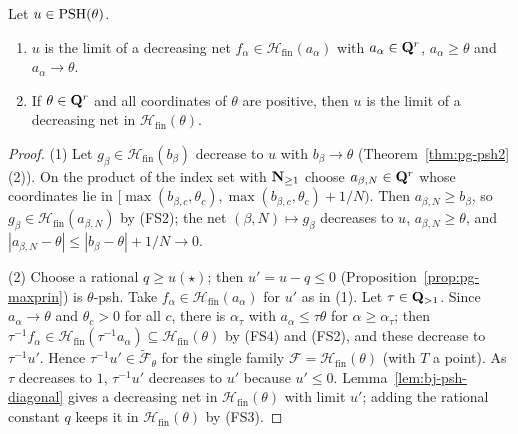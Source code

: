\begin{theorem}\label{thm:pg-regularization}
\leanok
{}
Let $u\in\operatorname{PSH}(\theta)$.
\begin{enumerate}
\item $u$ is the limit of a decreasing net $f_\alpha\in\mathcal H_{\mathrm{fin}}(a_\alpha)$ with $a_\alpha\in\mathbf{Q}^r$,
$a_\alpha\ge\theta$ and $a_\alpha\to\theta$.
\item If $\theta\in\mathbf{Q}^r$ and all coordinates of $\theta$ are positive, then $u$ is the limit of a decreasing net in
$\mathcal H_{\mathrm{fin}}(\theta)$.
\end{enumerate}
\end{theorem}

\begin{proof}
(1) Let $g_\beta\in\mathcal H_{\mathrm{fin}}(b_\beta)$ decrease to $u$ with $b_\beta\to\theta$ (Theorem~\ref{thm:pg-psh2}(2)). On the
product of the index set with $\mathbf{N}_{\ge1}$ choose $a_{\beta,N}\in\mathbf{Q}^r$ whose coordinates lie in
$[\max(b_{\beta,c},\theta_c),\max(b_{\beta,c},\theta_c)+1/N)$. Then $a_{\beta,N}\ge b_\beta$, so $g_\beta\in\mathcal H_{\mathrm{fin}}(a_{\beta,N})$ by
(FS2); the net $(\beta,N)\mapsto g_\beta$ decreases to $u$, $a_{\beta,N}\ge\theta$, and $|a_{\beta,N}-\theta|\le|b_\beta-\theta|+1/N\to0$.

(2) Choose a rational $q\ge u(\star)$; then $u'=u-q\le0$ (Proposition~\ref{prop:pg-maxprin}) is $\theta$-psh. Take
$f_\alpha\in\mathcal H_{\mathrm{fin}}(a_\alpha)$ for $u'$ as in (1). Let $\tau\in\mathbf{Q}_{>1}$. Since $a_\alpha\to\theta$ and $\theta_c>0$ for all
$c$, there is $\alpha_\tau$ with $a_\alpha\le\tau\theta$ for $\alpha\ge\alpha_\tau$; then
$\tau^{-1}f_\alpha\in\mathcal H_{\mathrm{fin}}(\tau^{-1}a_\alpha)\subseteq\mathcal H_{\mathrm{fin}}(\theta)$ by (FS4) and (FS2), and these decrease to
$\tau^{-1}u'$. Hence $\tau^{-1}u'\in\widetilde{\mathcal F}_\theta$ for the single family $\mathcal F=\mathcal H_{\mathrm{fin}}(\theta)$ (with $T$ a
point). As $\tau$ decreases to $1$, $\tau^{-1}u'$ decreases to $u'$ because $u'\le0$. Lemma~\ref{lem:bj-psh-diagonal} gives a
decreasing net in $\mathcal H_{\mathrm{fin}}(\theta)$ with limit $u'$; adding the rational constant $q$ keeps it in
$\mathcal H_{\mathrm{fin}}(\theta)$ by (FS3).
\end{proof}

